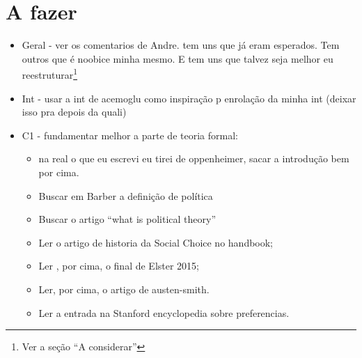 \documentclass{article}
\begin{document}
\section*{A fazer}

\begin{itemize}

\item {\Large Geral - ver os comentarios de Andre. tem uns que já eram
    esperados. Tem outros que é noobice minha mesmo. E tem uns que talvez seja
    melhor eu reestruturar\footnote{\textcolor{base01}{Ver a seção ``A
        considerar''}}}
\item {\Large Int - usar a int de acemoglu como inspiração p enrolação da minha
    int (deixar isso pra depois da quali)}
\item {\Large C1  - fundamentar melhor a parte de teoria formal}:
  \begin{itemize}

  \item na real o que eu escrevi eu tirei de oppenheimer, sacar a introdução bem
    por cima.
  \item Buscar em Barber a definição de política
  \item Buscar o artigo ``what is political theory''
  \item Ler o artigo de historia da Social Choice no handbook;
  \item Ler , por cima, o  final de Elster 2015;
  \item Ler, por cima,  o artigo de austen-smith.
  \item Ler a entrada na Stanford encyclopedia sobre preferencias.
    
  \end{itemize}


\end{itemize}
\end{document}
